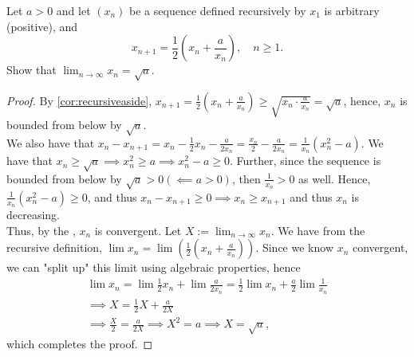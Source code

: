 \documentclass[12pt]{article}
\begin{document}
\begin{example}
  Let $a> 0$ and let $(x_n)$ be a sequence defined recursively by $x_1$ is arbitrary (positive), and \[x_{n+1} = \frac{1}{2}(x_n + \frac{a}{x_n}), \quad n \geq 1.\] Show that $\lim_{n\to\infty}x_n = \sqrt{a}$.
\end{example}
\begin{proof}
  By \cref{cor:recursiveaside}, $x_{n+1} = \frac{1}{2}(x_n + \frac{a}{x_n}) \geq \sqrt{x_n \cdot \frac{a}{x_n}} = \sqrt{a}$, hence, $x_n$ is bounded from below by $\sqrt{a}$.\\
  We also have that $x_n - x_{n+1} = x_n - \frac{1}{2}x_{n} - \frac{a}{2x_n} = \frac{x_n}{2} - \frac{a}{2x_n} = \frac{1}{x_n}\left(x_n^2 - a\right)$. We have that $x_n \geq \sqrt{a} \implies x_{n}^2 \geq a \implies x_{n}^2 -a \geq 0$. Further, since the sequence is bounded from below by $\sqrt{a} > 0 (\impliedby a > 0)$, then $\frac{1}{x_{n}} > 0$ as well. Hence, $\frac{1}{x_n}(x_n^2 - a) \geq 0$, and thus $x_{n} - x_{n+1} \geq 0 \implies x_n \geq x_{n+1}$ and thus $x_{n}$ is decreasing.\\
  Thus, by the , $x_n$ is convergent. Let $X:= \lim_{n\to\infty}x_n$. We have from the recursive definition, $\lim x_{n} = \lim \left(\frac{1}{2}(x_n + \frac{a}{x_n})\right)$. Since we know $x_{n}$ convergent, we can "split up" this limit using algebraic properties, hence\begin{align*}
    \lim x_n= \lim \frac{1}{2} x_n + \lim \frac{a}{2x_n} = \frac{1}{2}\lim x_n + \frac{a}{2} \lim \frac{1}{x_n}\\
    \implies X = \frac{1}{2}X + \frac{a}{2X}\\
    \implies \frac{X}{2} = \frac{a}{2X} \implies X^2 = a \implies X = \sqrt{a},
  \end{align*}
  which completes the proof.
\end{proof}
\end{document}
